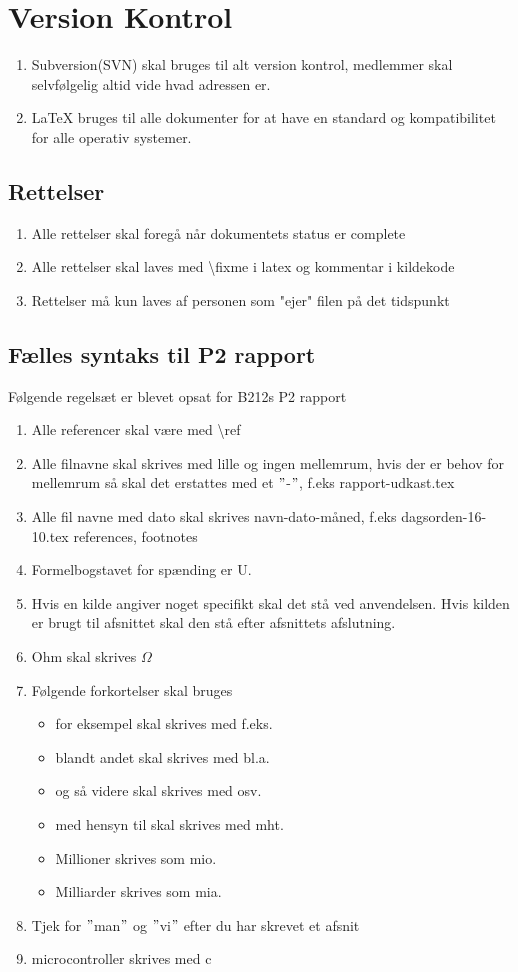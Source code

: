 \section{Version Kontrol}
\begin{enumerate}
\item{Subversion(SVN) skal bruges til alt version kontrol, medlemmer skal selvfølgelig altid vide hvad adressen er.}
\item{LaTeX bruges til alle dokumenter for at have en standard og kompatibilitet for alle operativ systemer.}
\end{enumerate}
\subsection{Rettelser}
\begin{enumerate}
\item Alle rettelser skal foregå når dokumentets status er complete
\item Alle rettelser skal laves med \textbackslash fixme i latex og kommentar i kildekode
\item Rettelser må kun laves af personen som "ejer" filen på det tidspunkt
\end{enumerate}
\subsection{Fælles syntaks til P2 rapport}
Følgende regelsæt er blevet opsat for B212s P2 rapport

\begin{enumerate}
\item Alle referencer skal være med \textbackslash ref
\item Alle filnavne skal skrives med lille og ingen mellemrum, hvis der er behov for mellemrum så skal det erstattes med et $"$-$"$, f.eks rapport-udkast.tex
\item Alle fil navne med dato skal skrives navn-dato-måned, f.eks dagsorden-16-10.tex
references, footnotes
\item Formelbogstavet for spænding er U.
\item Hvis en kilde angiver noget specifikt skal det stå ved anvendelsen. Hvis kilden er brugt til afsnittet skal den stå efter afsnittets afslutning.
\item Ohm skal skrives $\Omega$
\item Følgende forkortelser skal bruges
\begin{itemize}
\item for eksempel skal skrives med f.eks.
\item blandt andet skal skrives med bl.a.
\item og så videre skal skrives med osv. 
\item med hensyn til skal skrives med mht.
\item Millioner skrives som mio.
\item Milliarder skrives som mia.
\end{itemize}
\item Tjek for $"$man$"$ og $"$vi$"$ efter du har skrevet et afsnit
\item microcontroller skrives med c
\end{enumerate}

